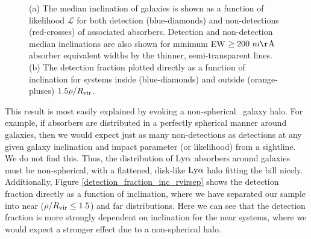 \begin{figure}[ht!]
        \centering
        \vspace{0pt}
        \caption{\small{(a) The median inclination of galaxies is shown as a function of likelihood $\mathcal{L}$ for both detection (blue-diamonds) and non-detections (red-crosses) of associated absorbers. Detection and non-detection median inclinations are also shown for minimum EW $\rm \ge 200~ m\AA$ absorber equivalent widths by the thinner, semi-transparent lines. (b) The detection fraction plotted directly as a function of inclination for systems inside (blue-diamonds) and outside (orange-pluses) $1.5 \rho / R_{\rm vir}$.}}
        \vspace{0pt}
        \label{detection_fraction_inc_both}
\end{figure}

This result is most easily explained by evoking a non-spherical \HI~galaxy halo. For example, if absorbers are distributed in a perfectly spherical manner around galaxies, then we would expect just as many non-detections as detections at any given galaxy inclination and impact parameter (or likelihood) from a sightline. We do not find this. Thus, the distribution of $\rm Ly\alpha$ absorbers around galaxies must be non-spherical, with a flattened, disk-like $\rm Ly\alpha$ halo fitting the bill nicely. Additionally, Figure \ref{detection_fraction_inc_rvirsep} shows the detection fraction directly as a function of inclination, where we have separated our sample into near ($\rho / R_{\rm vir} \leq 1.5$) and far distributions. Here we can see that the detection fraction is more strongly dependent on inclination for the near systems, where we would expect a stronger effect due to a non-spherical halo.




